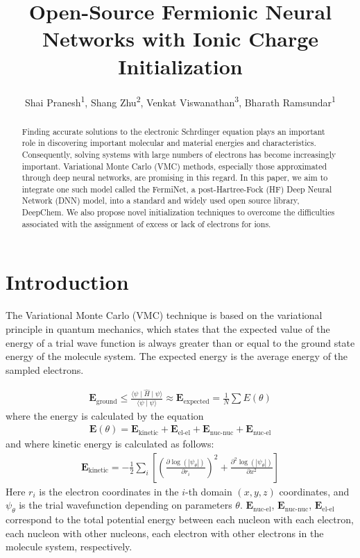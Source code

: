 \documentclass[letterpaper]{article} %
\title{Open-Source Fermionic Neural Networks with Ionic Charge Initialization}
\author{
    Shai Pranesh\textsuperscript{\rm 1},
    Shang Zhu\textsuperscript{\rm 2},
    Venkat Viswanathan\textsuperscript{\rm 3},
    Bharath Ramsundar\textsuperscript{\rm 1}
}
\begin{document}
\maketitle

\begin{abstract}
Finding accurate solutions to the electronic Schrdinger equation plays an important role in discovering important molecular and material energies and characteristics. Consequently, solving systems with large numbers of electrons has become increasingly important. Variational Monte Carlo (VMC) methods, especially those approximated through deep neural networks, are promising in this regard. In this paper, we aim to integrate one such model called the FermiNet, a post-Hartree-Fock (HF) Deep Neural Network (DNN) model, into a standard and widely used open source library, DeepChem. We also propose novel initialization techniques to overcome the difficulties associated with the assignment of excess or lack of electrons for ions.
\end{abstract}

\section{Introduction}

The Variational Monte Carlo (VMC) technique is based on the variational
principle in quantum mechanics, which states that the expected value of the
energy of a trial wave function is always greater than or equal to the ground
state energy of the molecule system. The expected energy is the average energy
of the sampled electrons.

\begin{align}
\textbf{E}_{\text{ground}} \leq \frac{\langle \psi \mid \hat{H} \mid \psi \rangle}{\langle \psi \mid \psi \rangle} \approx \textbf{E}_{\text{expected}} = \frac{1}{N} \sum E(\theta)
\end{align}
\noindent where the energy is calculated by the equation
\begin{align}
\mathbf{E}(\theta) = \mathbf{E}_{\text{kinetic}} + \mathbf{E}_{\text{el-el}} + \mathbf{E}_{\text{nuc-nuc}} + \mathbf{E}_{\text{nuc-el}}
\end{align}
\noindent and where kinetic energy is calculated as follows:
\begin{align}
\mathbf{E}_{\text{kinetic}} = -\frac{1}{2}\sum_{i}\left [ \left(\frac{\partial \log(|\psi_\theta|)}{\partial r_i}\right)^2 + \frac{\partial^2 \log(|\psi_\theta|)}{\partial x^2} \right ]
\end{align}
Here \(r_i\) is the electron coordinates in the \(i\)-th domain $(x, y, z)$ coordinates, and \(\psi_\theta\) is the trial wavefunction depending on parameters $\theta$. \(\mathbf{E}_{\text{nuc-el}}\), \(\mathbf{E}_{\text{nuc-nuc}}\), \(\mathbf{E}_{\text{el-el}}\) correspond to the total potential energy between each nucleon with each electron, each nucleon with other nucleons, each electron with other electrons in the molecule system, respectively.
\end{document}
